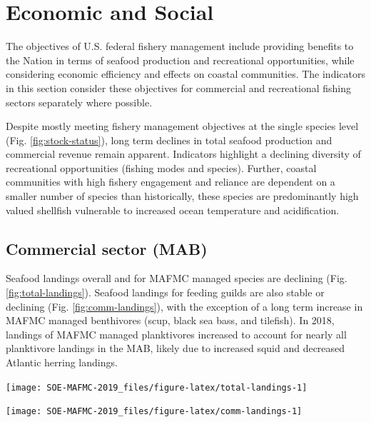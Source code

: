 \documentclass[10pt,]{article}
\let\origfigure\figure
\let\endorigfigure\endfigure
\renewenvironment{figure}[1][2] {
    \expandafter\origfigure\expandafter[H]
} {
    \endorigfigure
}
\begin{document}
\section{Economic and Social}\label{economic-and-social}

The objectives of U.S. federal fishery management include providing
benefits to the Nation in terms of seafood production and recreational
opportunities, while considering economic efficiency and effects on
coastal communities. The indicators in this section consider these
objectives for commercial and recreational fishing sectors separately
where possible.

Despite mostly meeting fishery management objectives at the single
species level (Fig. \ref{fig:stock-status}), long term declines in total
seafood production and commercial revenue remain apparent. Indicators
highlight a declining diversity of recreational opportunities (fishing
modes and species). Further, coastal communities with high fishery
engagement and reliance are dependent on a smaller number of species
than historically, these species are predominantly high valued shellfish
vulnerable to increased ocean temperature and acidification.

\subsection{Commercial sector (MAB)}\label{commercial-sector-mab}

Seafood landings overall and for MAFMC managed species are declining
(Fig. \ref{fig:total-landings}). Seafood landings for feeding guilds are
also stable or declining (Fig. \ref{fig:comm-landings}), with the
exception of a long term increase in MAFMC managed benthivores (scup,
black sea bass, and tilefish). In 2018, landings of MAFMC managed
planktivores increased to account for nearly all planktivore landings in
the MAB, likely due to increased squid and decreased Atlantic herring
landings.

\begin{figure}

{\centering \texttt{[image: SOE-MAFMC-2019\_files/figure-latex/total-landings-1]} 

}

\caption{Total commercial seafood landings (black) and Mid-Atlantic managed seafood landings (red).}\label{fig:total-landings}
\end{figure}

\begin{figure}

{\centering \texttt{[image: SOE-MAFMC-2019\_files/figure-latex/comm-landings-1]} 

}

\caption{MAFMC managed species landings (red) and total commercial landings (black) by feeding guild.}\label{fig:comm-landings}
\end{figure}
\end{document}
